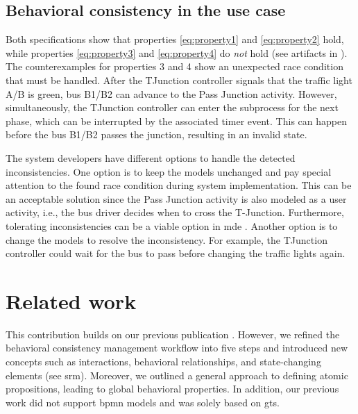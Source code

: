 \documentclass{jot}
\begin{document}
\subsection{Behavioral consistency in the use case}
Both specifications show that properties \eqref{eq:property1} and \eqref{eq:property2} hold, while properties \eqref{eq:property3} and \eqref{eq:property4} do \emph{not} hold (see artifacts in \cite{krauterArtifactsBehavioralConsistency2022}).
The counterexamples for properties 3 and 4 show an unexpected race condition that must be handled.
After the TJunction controller signals that the traffic light A/B is green, bus B1/B2 can advance to the \textsf{Pass Junction} activity.
However, simultaneously, the TJunction controller can enter the subprocess for the next phase, which can be interrupted by the associated timer event.
This can happen before the bus B1/B2 passes the junction, resulting in an invalid state.

The system developers have different options to handle the detected inconsistencies.
One option is to keep the models unchanged and pay special attention to the found race condition during system implementation.
This can be an acceptable solution since the \textsf{Pass Junction} activity is also modeled as a user activity, i.e., the bus driver decides when to cross the T-Junction.
Furthermore, tolerating inconsistencies can be a viable option in \gls*{mde} \cite{weidmannToleranceModelDrivenEngineering2021}.
Another option is to change the models to resolve the inconsistency.
For example, the TJunction controller could wait for the bus to pass before changing the traffic lights again.


\section{Related work} \label{sec:related_work}
This contribution builds on our previous publication \cite{krauterBehavioralConsistencyHeterogeneous2021}.
However, we refined the behavioral consistency management workflow into five steps and introduced new concepts such as interactions, behavioral relationships, and state-changing elements (see \gls*{srm}).
Moreover, we outlined a general approach to defining atomic propositions, leading to global behavioral properties.
In addition, our previous work did not support \gls*{bpmn} models and was solely based on \gls*{gt}s.
\end{document}
